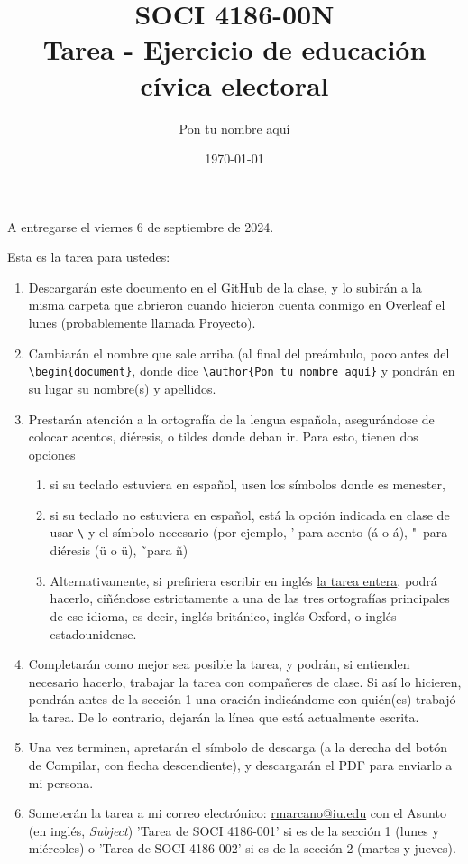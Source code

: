 \documentclass[11pt]{article} %
\title{SOCI 4186-00N\\ Tarea \textnumero 2 - Ejercicio de educaci\'on c\'ivica electoral}
\author{Pon tu nombre aquí}
\date{\today}
\begin{document}
\maketitle
\begin{center}
A entregarse el viernes 6 de septiembre de 2024. 
\end{center}

Esta es la tarea para ustedes: 
\begin{enumerate}
    \item Descargarán este documento en el GitHub de la clase, y lo subirán a la misma carpeta que abrieron cuando hicieron cuenta conmigo en Overleaf el lunes (probablemente llamada Proyecto).
    \item Cambiarán el nombre que sale arriba (al final del preámbulo, poco antes del \texttt{\textbackslash begin\{document\}}, donde dice \texttt{\textbackslash author\{Pon tu nombre aquí\}} y pondrán en su lugar su nombre(s) y apellidos.
    \item Prestarán atención a la ortografía de la lengua española, asegurándose de colocar acentos, diéresis, o tildes donde deban ir. Para esto, tienen dos opciones 
    \begin{enumerate}
        \item si su teclado estuviera en español, usen los símbolos donde es menester,
        \item si su teclado no estuviera en español, está la opción indicada en clase de usar \texttt{\textbackslash} y el símbolo necesario (por ejemplo, ' para acento (\'a o \'{a}), "\ para diéresis (\"u o \"{u}), \~\ para \~n)
        \item Alternativamente, si prefiriera escribir en inglés \underline{la tarea entera}, podrá hacerlo, ciñéndose estrictamente a una de las tres ortografías principales de ese idioma, es decir, inglés británico, inglés Oxford, o inglés estadounidense.
    \end{enumerate}
    \item Completarán como mejor sea posible la tarea, y podrán, si entienden necesario hacerlo, trabajar la tarea con compañeres de clase. Si así lo hicieren, pondrán antes de la sección 1 una oración indicándome con quién(es) trabajó la tarea. De lo contrario, dejarán la línea que está actualmente escrita.
    \item  Una vez terminen, apretarán el símbolo de descarga (a la derecha del botón de Compilar, con flecha descendiente), y descargarán el PDF para enviarlo a mi persona.
    \item Someterán la tarea a mi correo electrónico: \href{mailto:rmarcano@iu.edu}{rmarcano@iu.edu} con el Asunto (en inglés, \textit{Subject}) 'Tarea de SOCI 4186-001' si es de la sección 1 (lunes y miércoles) o 'Tarea de SOCI 4186-002' si es de la sección 2 (martes y jueves).
\end{enumerate}
\end{document}
